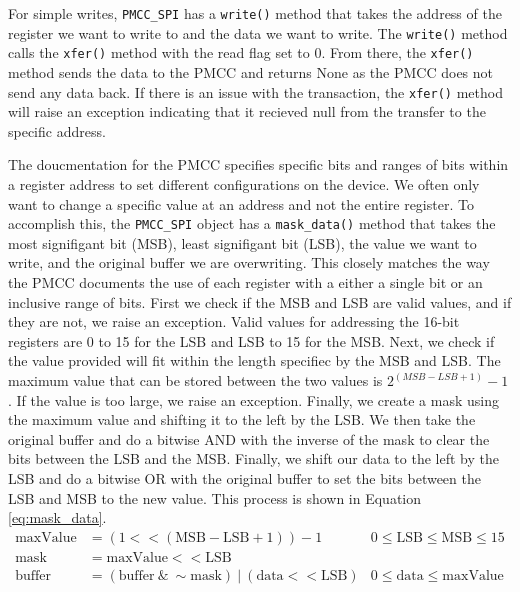 For simple writes, \verb|PMCC_SPI| has a \verb|write()| method that takes the address of the register we want to write to and the data we want to write.
The \verb|write()| method calls the \verb|xfer()| method with the read flag set to 0.
From there, the \verb|xfer()| method sends the data to the PMCC and returns None as the PMCC does not send any data back.
If there is an issue with the transaction, the \verb|xfer()| method will raise an exception indicating that it recieved null from the transfer to the specific address. 

The doucmentation for the PMCC specifies specific bits and ranges of bits within a register address to set different configurations on the device.
We often only want to change a specific value at an address and not the entire register.
To accomplish this, the \verb|PMCC_SPI| object has a \verb|mask_data()| method that takes the most signifigant bit (MSB), least signifigant bit (LSB), the value we want to write, and the original buffer we are overwriting.
This closely matches the way the PMCC documents the use of each register with a either a single bit or an inclusive range of bits. 
First we check if the MSB and LSB are valid values, and if they are not, we raise an exception.
Valid values for addressing the 16-bit registers are 0 to 15 for the LSB and LSB to 15 for the MSB.
Next, we check if the value provided will fit within the length specifiec by the MSB and LSB.
The maximum value that can be stored between the two values is $2^{(MSB-LSB+1)}-1$.
If the value is too large, we raise an exception.
Finally, we create a mask using the maximum value and shifting it to the left by the LSB.
We then take the original buffer and do a bitwise AND with the inverse of the mask to clear the bits between the LSB and the MSB. 
Finally, we shift our data to the left by the LSB and do a bitwise OR with the original buffer to set the bits between the LSB and MSB to the new value.
This process is shown in Equation \ref{eq:mask_data}.
\begin{align}
    \label{eq:mask_data}
    \text{maxValue} &= (1 << (\text{MSB} - \text{LSB} + 1)) - 1 & 0 \leq \text{LSB} \leq \text{MSB} \leq 15\\
    \text{mask} &= \text{maxValue} << \text{LSB} \\
    \text{buffer} &= (\text{buffer}\ \&\ \sim\text{mask})\ |\ (\text{data} << \text{LSB}) & 0 \leq \text{data} \leq \text{maxValue}
\end{align}

